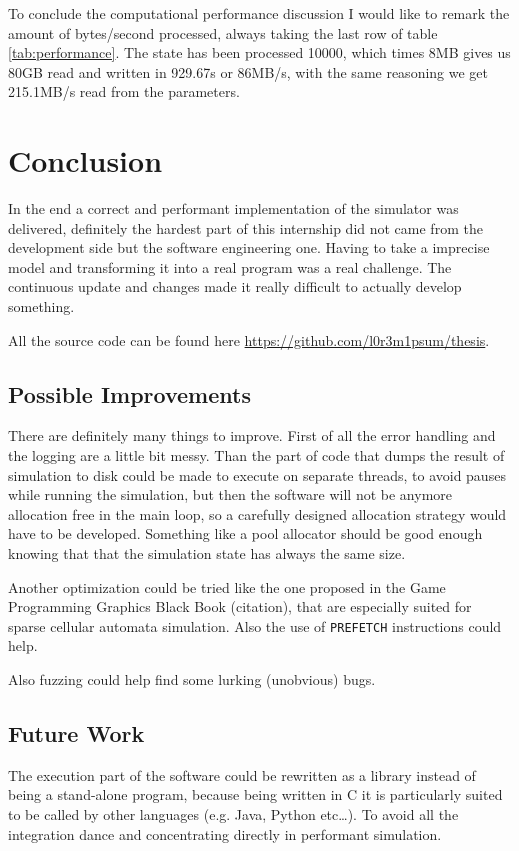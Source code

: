 \documentclass[Lau]{sapthesis} %
\let\oldsection\section
\def\subsection{\oldsection}
\def\section{\chapter}
\begin{document}
To conclude the computational performance discussion I would like to remark the
amount of bytes/second processed, always taking the last row of table
\ref{tab:performance}. The state has been processed 10000, which times 8MB gives
us 80GB read and written in 929.67s or 86MB/s, with the same reasoning we get
215.1MB/s read from the parameters.


\section{Conclusion}

In the end a correct and performant implementation of the simulator was
delivered, definitely the hardest part of this internship did not came from the
development side but the software engineering one. Having to take a imprecise
model and transforming it into a real program was a real challenge. The
continuous update and changes made it really difficult to actually develop
something.

All the source code can be found here
\url{https://github.com/l0r3m1psum/thesis}.

\subsection{Possible Improvements}

There are definitely many things to improve. First of all the error handling and
the logging are a little bit messy. Than the part of code that dumps the result
of simulation to disk could be made to execute on separate threads, to avoid
pauses while running the simulation, but then the software will not be anymore
allocation free in the main loop, so a carefully designed allocation strategy
would have to be developed. Something like a pool allocator should be good
enough knowing that that the simulation state has always the same size.

Another optimization could be tried like the one proposed in the Game
Programming Graphics Black Book (citation), that are especially suited for
sparse cellular automata simulation. Also the use of \texttt{PREFETCH}
instructions could help.

Also fuzzing could help find some lurking (unobvious) bugs.

\subsection{Future Work}

The execution part of the software could be rewritten as a library instead of
being a stand-alone program, because being written in C it is particularly
suited to be called by other languages (e.g. Java, Python etc\dots). To avoid
all the integration dance and concentrating directly in performant simulation.
\end{document}
